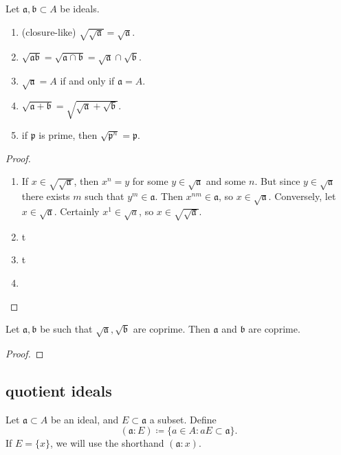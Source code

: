 \documentclass[12pt]{article}
\begin{document}
\begin{proposition}
	Let $\mathfrak{a},\mathfrak{b}\subset A$ be ideals.
	\begin{enumerate}
		\item (closure-like) $\sqrt{\sqrt{\mathfrak{\mathfrak{a}}} %
			} = \sqrt{\mathfrak{a}}$.
		\item $\sqrt{\mathfrak{a}\mathfrak{b}} = \sqrt{\mathfrak{a}\cap\mathfrak{b}} = \sqrt{\mathfrak{a}}\cap\sqrt{\mathfrak{b}}$.
		\item $\sqrt{\mathfrak{a}} = A$ if and only if $\mathfrak{a}=A$.
		\item $\sqrt{\mathfrak{a}+\mathfrak{b}} = \sqrt{\sqrt{\mathfrak{a}} + \sqrt{\mathfrak{b}}%
			}$.
		\item if $\mathfrak{p}$ is prime, then $\sqrt{\mathfrak{p}^n}=\mathfrak{p}$. 
	\end{enumerate}
\end{proposition}
\begin{proof}
	\hfill
	\begin{enumerate}
		\item If $x\in\sqrt{\sqrt{\mathfrak{a}} %
				}$, then $x^n=y$ for some $y\in\sqrt{\mathfrak{a}}$ and some $n$. But since $y\in\sqrt{\mathfrak{a}}$ there exists $m$ such that $y^m\in\mathfrak{a}$. Then $x^{nm}\in\mathfrak{a}$, so $x\in \sqrt{\mathfrak{a}}$. Conversely, let $x\in \sqrt{\mathfrak{a}}$. Certainly $x^1\in\sqrt{a}$, so $x\in\sqrt{\sqrt{\mathfrak{a}}%
			}$.
		\item t 
		\item t 
		\item {}
	\end{enumerate}
\end{proof}

\begin{corollary}
	Let $\mathfrak{a},\mathfrak{b}$ be such that $\sqrt{\mathfrak{a}},\sqrt{\mathfrak{b}}$ are coprime. Then $\mathfrak{a}$ and $\mathfrak{b}$ are coprime.
\end{corollary}
\begin{proof}
\end{proof}


\subsection{quotient ideals} %

\begin{definition}
	Let $\mathfrak{a}\subset A$ be an ideal, and $E\subset \mathfrak{a}$ a subset. Define 
	\begin{equation*}
		(\mathfrak{a}:E) \coloneqq \{a\in A : aE\subset\mathfrak{a} \}.
	\end{equation*}
	If $E=\{x\}$, we will use the shorthand $(\mathfrak{a}:x)$.
\end{definition}
\end{document}
